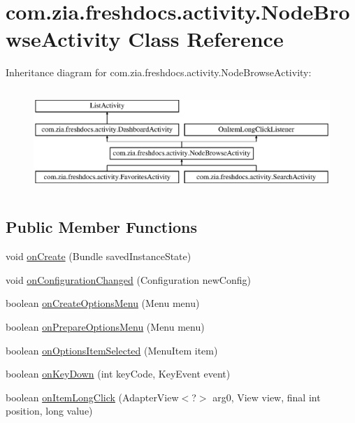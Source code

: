 \hypertarget{classcom_1_1zia_1_1freshdocs_1_1activity_1_1_node_browse_activity}{\section{com.\-zia.\-freshdocs.\-activity.\-Node\-Browse\-Activity Class Reference}
\label{classcom_1_1zia_1_1freshdocs_1_1activity_1_1_node_browse_activity}
}
Inheritance diagram for com.\-zia.\-freshdocs.\-activity.\-Node\-Browse\-Activity\-:\begin{figure}[H]
\begin{center}
\leavevmode
\includegraphics[height=3.929825cm]{classcom_1_1zia_1_1freshdocs_1_1activity_1_1_node_browse_activity}
\end{center}
\end{figure}
\subsection*{Public Member Functions}
\begin{DoxyCompactItemize}
\item 
void \hyperlink{classcom_1_1zia_1_1freshdocs_1_1activity_1_1_node_browse_activity_a9b74d98ea3413180008c35fdff19c36a}{on\-Create} (Bundle saved\-Instance\-State)
\item 
void \hyperlink{classcom_1_1zia_1_1freshdocs_1_1activity_1_1_node_browse_activity_a7d667677b4864dfbe72a888debbb08ec}{on\-Configuration\-Changed} (Configuration new\-Config)
\item 
boolean \hyperlink{classcom_1_1zia_1_1freshdocs_1_1activity_1_1_node_browse_activity_aa02c452bd1740fd0a2d12d7029be6849}{on\-Create\-Options\-Menu} (Menu menu)
\item 
boolean \hyperlink{classcom_1_1zia_1_1freshdocs_1_1activity_1_1_node_browse_activity_aaed1e171ed3584f0a95c35663581d11d}{on\-Prepare\-Options\-Menu} (Menu menu)
\item 
boolean \hyperlink{classcom_1_1zia_1_1freshdocs_1_1activity_1_1_node_browse_activity_a1602b629c7ccbb1dc7e857acada93e5e}{on\-Options\-Item\-Selected} (Menu\-Item item)
\item 
boolean \hyperlink{classcom_1_1zia_1_1freshdocs_1_1activity_1_1_node_browse_activity_addd0ddcb8790c50b2fcc3cb96f293f38}{on\-Key\-Down} (int key\-Code, Key\-Event event)
\item 
boolean \hyperlink{classcom_1_1zia_1_1freshdocs_1_1activity_1_1_node_browse_activity_a9ac12429b3e2248147fee5ba0b005ccd}{on\-Item\-Long\-Click} (Adapter\-View$<$?$>$ arg0, View view, final int position, long value)
\end{DoxyCompactItemize}
